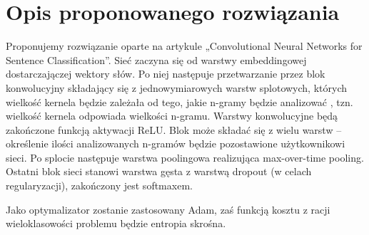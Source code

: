 \newpage
\section{Opis proponowanego rozwiązania}
Proponujemy rozwiązanie oparte na artykule „Convolutional Neural Networks for Sentence
Classification”. Sieć zaczyna się od warstwy embeddingowej dostarczajączej
wektory słów. Po niej następuje przetwarzanie przez blok konwolucyjny składający się z jednowymiarowych warstw
splotowych, których wielkość kernela będzie zależała od tego, jakie n-gramy będzie analizować
, tzn. wielkość kernela odpowiada wielkości n-gramu. Warstwy konwolucyjne będą zakończone
funkcją aktywacji ReLU. Blok może składać się z wielu warstw -- określenie ilości 
analizowanych n-gramów będzie pozostawione użytkownikowi sieci.
Po splocie następuje warstwa poolingowa realizująca
max-over-time pooling. Ostatni blok sieci stanowi warstwa gęsta z warstwą dropout
(w celach regularyzacji), zakończony jest softmaxem.

Jako optymalizator zostanie zastosowany Adam, zaś funkcją kosztu z racji wieloklasowości
problemu będzie entropia skrośna.